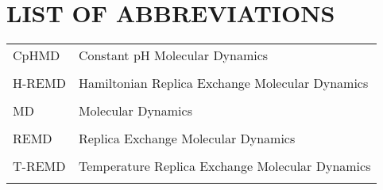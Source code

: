 
\chapter*{LIST OF ABBREVIATIONS}

\singlespacing

\begin{tabular}{lp{5in}}

CpHMD & Constant pH Molecular Dynamics \\ \\

H-REMD & Hamiltonian Replica Exchange Molecular Dynamics \\ \\

MD & Molecular Dynamics \\ \\

REMD & Replica Exchange Molecular Dynamics \\ \\

T-REMD & Temperature Replica Exchange Molecular Dynamics \\ \\

\end{tabular}

